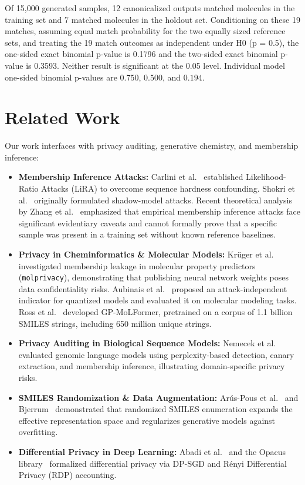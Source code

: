 \documentclass[10pt,journal,compsoc]{IEEEtran}
\begin{document}


Of 15,000 generated samples, 12 canonicalized outputs matched molecules in the training set and 7 matched molecules in the holdout set. Conditioning on these 19 matches, assuming equal match probability for the two equally sized reference sets, and treating the 19 match outcomes as independent under H0 (p = 0.5), the one-sided exact binomial p-value is 0.1796 and the two-sided exact binomial p-value is 0.3593. Neither result is significant at the 0.05 level. Individual model one-sided binomial p-values are $0.750$, $0.500$, and $0.194$.

\section{Related Work}
Our work interfaces with privacy auditing, generative chemistry, and membership inference:
\begin{itemize}
    \item \textbf{Membership Inference Attacks:} Carlini et al.~\cite{carlini2022membership} established Likelihood-Ratio Attacks (LiRA) to overcome sequence hardness confounding. Shokri et al.~\cite{shokri2017membership} originally formulated shadow-model attacks. Recent theoretical analysis by Zhang et al.~\cite{zhang2024membership} emphasized that empirical membership inference attacks face significant evidentiary caveats and cannot formally prove that a specific sample was present in a training set without known reference baselines.
    \item \textbf{Privacy in Cheminformatics \& Molecular Models:} Kr{\"u}ger et al.~\cite{kruger2025publishing} investigated membership leakage in molecular property predictors (\texttt{molprivacy}), demonstrating that publishing neural network weights poses data confidentiality risks. Aubinais et al.~\cite{aubinais2026indicator} proposed an attack-independent indicator for quantized models and evaluated it on molecular modeling tasks. Ross et al.~\cite{ross2025gpmolformer} developed GP-MoLFormer, pretrained on a corpus of 1.1 billion SMILES strings, including 650 million unique strings.
    \item \textbf{Privacy Auditing in Biological Sequence Models:} Nemecek et al.~\cite{nemecek2026quantifying} evaluated genomic language models using perplexity-based detection, canary extraction, and membership inference, illustrating domain-specific privacy risks.
    \item \textbf{SMILES Randomization \& Data Augmentation:} Ar{\'u}s-Pous et al.~\cite{aruspous2019randomized} and Bjerrum~\cite{bjerrum2017smiles} demonstrated that randomized SMILES enumeration expands the effective representation space and regularizes generative models against overfitting.
    \item \textbf{Differential Privacy in Deep Learning:} Abadi et al.~\cite{abadi2016deep} and the Opacus library~\cite{opacus2021} formalized differential privacy via DP-SGD and R\'enyi Differential Privacy (RDP) accounting.
\end{itemize}
\end{document}
